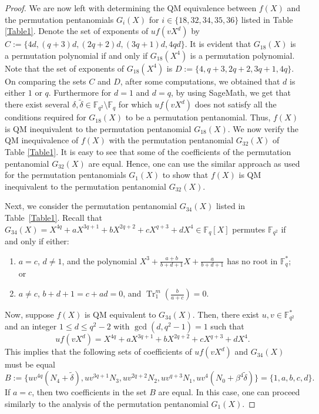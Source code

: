\documentclass[12pt]{amsart}
\numberwithin{equation}{section}
\theoremstyle{definition}
\newcommand{\F}{\mathbb F}
\begin{document}
\begin{proof}
We are now left with determining the QM equivalence between $f(X)$ and the permutation pentanomials $G_i(X)$ for $i \in \{18, 32, 34, 35, 36\}$ listed in Table \ref{Table1}. Denote the set of exponents of $uf(vX^d)$ by $C:=\{4d,(q+3)d,(2q+2)d,(3q+1)d,4qd\}$. It is evident that $G_{18}(X)$ is a permutation polynomial if and only if $G_{18}(X^4)$ is a permutation polynomial. Note that the set of exponents of $G_{18}(X^4)$ is $D:=\{4,q+3,2q+2,3q+1,4q\}$. On comparing the sets $C$ and $D$, after some computations, we obtained that $d$ is either $1$ or $q$. Furthermore for $d=1$ and $d=q$, by using SageMath, we  get that there exist several $\delta, \tilde \delta \in\F_{q^2} \setminus \F_q$ for which $uf(vX^d)$ does not satisfy all the conditions required for $G_{18}(X)$ to be a permutation pentanomial. Thus, $f(X)$ is QM inequivalent to the permutation pentanomial $G_{18}(X)$. We now verify  the QM inequivalence of $f(X)$ with the permutation pentanomial $G_{32}(X)$ of Table \ref{Table1}. It is easy to see that some of the coefficients of the permutation pentanomial $G_{32}(X)$ are equal. Hence, one can use the similar approach as used for the permutation pentanomials $G_{1}(X)$ to show that $f(X)$ is QM inequivalent to the permutation pentanomial $G_{32}(X)$. 

Next, we consider the permutation pentanomial $G_{34}(X)$ listed in Table~\ref{Table1}. Recall that \( G_{34}(X) = X^{4q} + aX^{3q+1} + bX^{2q+2} + cX^{q+3} + dX^{4} \in \mathbb{F}_q[X] \) permutes \( \mathbb{F}_{q^2} \) if and only if either:
\begin{enumerate}
    \item \( a = c \), \( d \neq 1 \), and the polynomial \( X^3 + \frac{a+b}{b+d+1}X + \frac{a}{b+d+1} \) has no root in \( \mathbb{F}_q^* \); or  
    \item \( a \neq c \), \( b+d+1 = c+ad = 0 \), and \( \operatorname{Tr}_1^m \left(\frac{b}{a+c}\right) = 0 \).
\end{enumerate}
Now, suppose \( f(X) \) is QM equivalent to \(G_{34}(X) \). Then, there exist \( u, v \in \mathbb{F}_{q^2}^* \) and an integer \( 1 \leq d \leq q^2 - 2 \) with \( \gcd(d, q^2 - 1) = 1 \) such that  
\[
uf(vX^d) = X^{4q} + aX^{3q+1} + bX^{2q+2} + cX^{q+3} + dX^4.
\]  
This implies that the following sets of coefficients of \( uf(vX^d) \) and \( G_{34}(X) \) must be equal
\[
B := \{ uv^{4q} (N_4 + \tilde{\delta}), uv^{3q+1} N_3, uv^{2q+2} N_2, uv^{q+3} N_1, uv^4 (N_0 + \beta^4 \tilde{\delta}) \} = \{1, a, b, c, d\}.
\]  
If \( a = c \), then two coefficients in the set \( B \) are equal. In this case, one can proceed similarly to the analysis of the permutation pentanomial $G_{1}(X)$.  


\end{proof}
\end{document}
